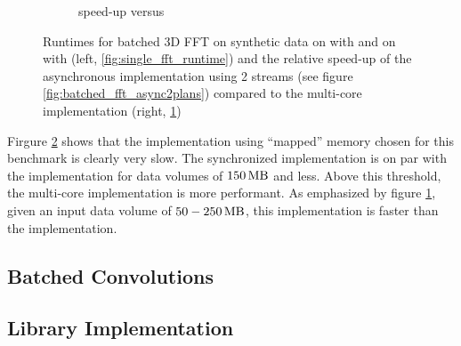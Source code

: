 \begin{figure}[h]
\begin{subfigure}[b]{0.45\textwidth}
    \caption{\gpu{} speed-up versus \cpu{}}
    \label{fig:batched_fft_speed_up}
  \end{subfigure}
  \hfill
  \caption{Runtimes for batched 3D FFT on synthetic data on \cpu{} with \fftw{} and on \gpu{} with \cufft{} (left, \ref{fig:single_fft_runtime}) and the relative speed-up of the asynchronous \gpu{} implementation using 2 streams (see figure \ref{fig:batched_fft_async2plans}) compared to the multi-core \cpu{} implementation (right, \ref{fig:batched_fft_speed_up})}
  \label{fig:rt_batched_fft}
\end{figure}


Firgure \ref{fig:rt_batched_fft} shows that the implementation using ``mapped'' memory chosen for this benchmark is clearly very slow. The synchronized implementation is on par with the \cpu{} implementation for data volumes of $\unit[150]{MB}$ and less. Above this threshold, the multi-core implementation is more performant. As emphasized by figure \ref{fig:batched_fft_speed_up}, given an input data volume of $\unit[50-250]{MB}$, this implementation is faster than the \cpu{} implementation. 

\subsection{Batched Convolutions}


\subsection{Library Implementation}